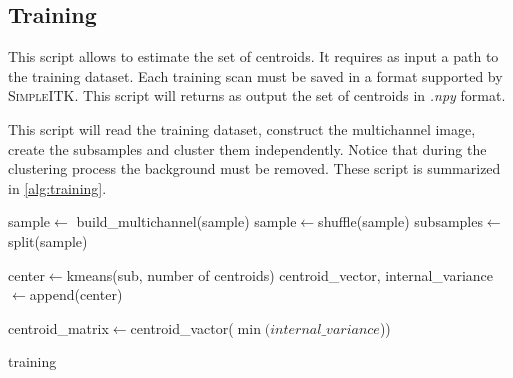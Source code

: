\documentclass{standalone}
\begin{document}
	\subsection{Training}
	
	This script allows to estimate the set of centroids. It requires as input a path to the training dataset. Each training scan must be saved in a format supported by \textsc{SimpleITK}. This script will returns as output the set of centroids in \textit{.npy} format.
	
	This script will read the training dataset,  construct the multichannel image, create the subsamples and cluster them independently. Notice that during the clustering process the background must be removed. These script is summarized in \ref{alg:training}.
	
	
		\begin{algorithm}
		
		\SetAlgoLined
		\DontPrintSemicolon
		
		\;
		
		\;
		sample$\leftarrow$ build\_multichannel(sample)\;
		sample$\leftarrow$shuffle(sample)\;
		subsamples$\leftarrow$split(sample)\;
		
		{
			center$\leftarrow$kmeans(sub, number of centroids)\;
			centroid\_vector, internal\_variance$\leftarrow$append(center)
			
		}\;
		
		centroid\_matrix$\leftarrow$centroid\_vactor($\min(internal\_variance$))\;
		
		\caption{training}\label{alg:training}
		
	\end{algorithm}
\end{document}
